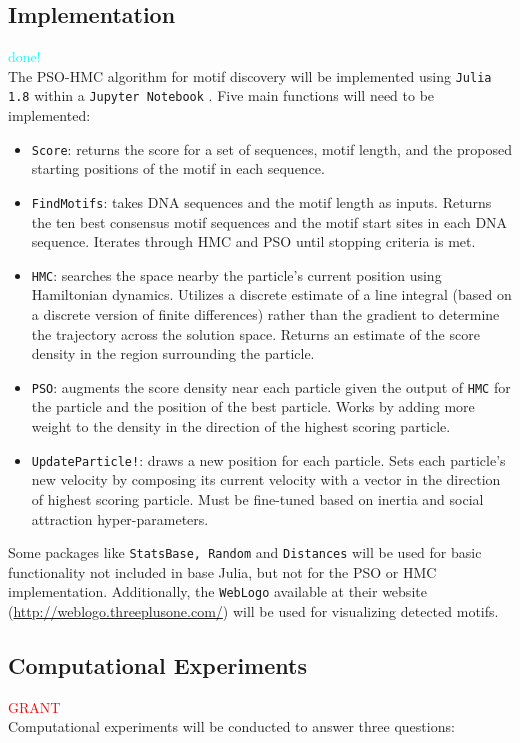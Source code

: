 \documentclass{article}
\begin{document}
\subsection{Implementation}
\textcolor{cyan}{done!} \\
The PSO-HMC algorithm for motif discovery will be implemented using \texttt{Julia 1.8} \cite{Julia-2017} within a  \texttt{Jupyter Notebook}  \cite{Kluyver2016jupyter}. Five main functions will need to be implemented:
\begin{itemize}
	\item \texttt{Score}: returns the score for a set of sequences, motif length, and the proposed starting positions of the motif in each sequence.
	\item \texttt{FindMotifs}: takes DNA sequences and the motif length as inputs. Returns the ten best consensus motif sequences and the motif start sites in each DNA sequence. Iterates through HMC and PSO until stopping criteria is met.
	\item \texttt{HMC}: searches the space nearby the particle's current position using Hamiltonian dynamics. Utilizes a discrete estimate of a line integral (based on a discrete version of finite differences) rather than the gradient to determine the trajectory across the solution space. Returns an estimate of the score density in the region surrounding the particle.
	\item \texttt{PSO}: augments the score density near each particle given the output of \texttt{HMC} for the particle and the position of the best particle. Works by adding more weight to the density in the direction of the highest scoring particle.
	\item \texttt{UpdateParticle!}: draws a new position for each particle. Sets each particle's new velocity by composing its current velocity with a vector in the direction of highest scoring particle. Must be fine-tuned based on inertia and social attraction hyper-parameters.
\end{itemize}
  Some packages like \texttt{StatsBase, Random} and \texttt{Distances} will be used for basic functionality not included in base Julia, but not for the PSO or HMC implementation. Additionally, the \texttt{WebLogo} available at their website (\url{http://weblogo.threeplusone.com/}) will be used for visualizing detected motifs.
\subsection{Computational Experiments}
\textcolor{red}{GRANT} \\  
  Computational experiments will be conducted to answer three questions:
\end{document}
